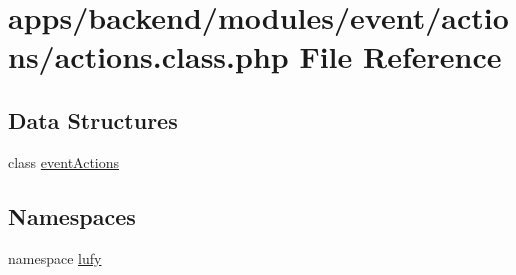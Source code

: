 \hypertarget{backend_2modules_2event_2actions_2actions_8class_8php}{\section{apps/backend/modules/event/actions/actions.class.\-php File Reference}
\label{backend_2modules_2event_2actions_2actions_8class_8php}
}
\subsection*{Data Structures}
\begin{DoxyCompactItemize}
\item 
class \hyperlink{classevent_actions}{event\-Actions}
\end{DoxyCompactItemize}
\subsection*{Namespaces}
\begin{DoxyCompactItemize}
\item 
namespace \hyperlink{namespacelufy}{lufy}
\end{DoxyCompactItemize}
